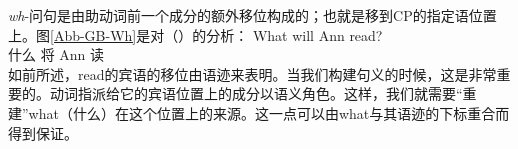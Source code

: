 \emph{wh}-问句是由助动词前一个成分的额外移位构成的；也就是移到CP的指定语位置上。图\vref{Abb-GB-Wh}是对（）的分析：
\ea
\gll What will Ann read?\\
      什么 将 Ann 读\\
\z
%
如前所述，read的宾语的移位由语迹来表明。当我们构建句义的时候，这是非常重要的。动词指派给它的宾语位置上的成分以语义角色。这样，我们就需要``重建''what（什么）在这个位置上的来源。这一点可以由what与其语迹的下标重合而得到保证。

